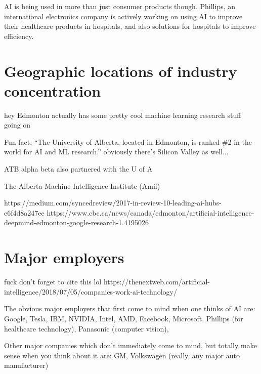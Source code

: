 \documentclass[letterpaper,12pt]{article}
\begin{document}
AI is being used in more than just consumer products though. Phillips,
an international electronics company is actively working on using
AI to improve their healthcare products in hospitals, and also 
solutions for hospitals to improve efficiency.




\section{Geographic locations of industry concentration}
hey Edmonton actually has some pretty cool machine learning research stuff
going on

Fun fact, ``The University of Alberta, located in Edmonton, is ranked \#2 in the world for AI and ML research.''
obviously there's Silicon Valley as well...

ATB alpha beta
also partnered with the U of A

The
Alberta
Machine
Intelligence
Institute
(Amii)

https://medium.com/syncedreview/2017-in-review-10-leading-ai-hubs-e6f4d8a247ee
https://www.cbc.ca/news/canada/edmonton/artificial-intelligence-deepmind-edmonton-google-research-1.4195026

\section{Major employers}

fuck don't forget to cite this lol https://thenextweb.com/artificial-intelligence/2018/07/05/companies-work-ai-technology/

The obvious major employers that first come to mind when one thinks of AI are:
Google,
Tesla,
IBM,
NVIDIA, Intel, AMD,
Facebook,
Microsoft,
Phillips (for healthcare technology),
Panasonic (computer vision),


Other major companies which don't immediately come to mind, but totally make sense when you think about it are:
GM,
Volkswagen (really, any major auto manufacturer)
\end{document}
